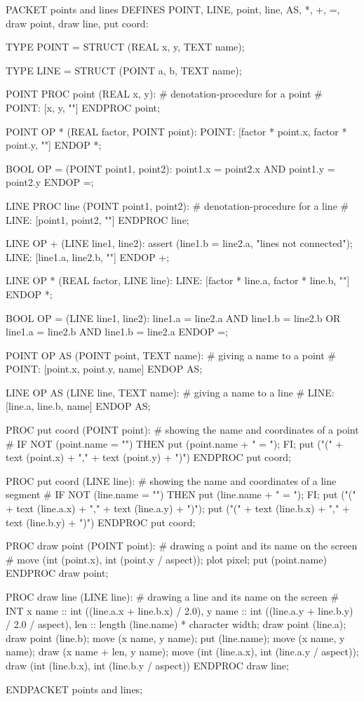 \begin{elan}
PACKET points and lines
DEFINES POINT, LINE,
        point, line, AS, *, +, =,
        draw point, draw line, put coord:

TYPE POINT = STRUCT (REAL x, y, TEXT name);

TYPE LINE = STRUCT (POINT a, b, TEXT name); 

POINT PROC point (REAL x, y):
  \# denotation-procedure for a point \#
  POINT: [x, y, ""]
ENDPROC point;

POINT OP * (REAL factor, POINT point):
  POINT: [factor * point.x, factor * point.y, ""]
ENDOP *;

BOOL OP = (POINT point1, point2):
  point1.x = point2.x AND point1.y = point2.y
ENDOP =;

LINE PROC line (POINT point1, point2):
  \# denotation-procedure for a line \#
  LINE: [point1, point2, ""]
ENDPROC line;

LINE OP + (LINE line1, line2):
  assert (line1.b = line2.a, "lines not connected");
  LINE: [line1.a, line2.b, ""]
ENDOP +;

LINE OP * (REAL factor, LINE line):
  LINE: [factor * line.a, factor * line.b, ""]
ENDOP *;

BOOL OP = (LINE line1, line2):
  line1.a = line2.a AND line1.b = line2.b OR
  line1.a = line2.b AND line1.b = line2.a
ENDOP =;

POINT OP AS (POINT point, TEXT name):
  \# giving a name to a point \#
  POINT: [point.x, point.y, name]
ENDOP AS;

LINE OP AS (LINE line, TEXT name):
  \# giving a name to a line \#
  LINE: [line.a, line.b, name]
ENDOP AS;

PROC put coord (POINT point):
  \# showing the name and coordinates of a point \#
  IF NOT (point.name = "")
  THEN put (point.name + " = ");
  FI;
  put ("(" + text (point.x) + "," + text (point.y) + ")")
ENDPROC put coord;

PROC put coord (LINE line):
  \# showing the name and coordinates of a line segment \#
  IF NOT (line.name = "")
  THEN put (line.name + " = ");
  FI;
  put ("(" + text (line.a.x) + "," + text (line.a.y) + ")");
  put ("(" + text (line.b.x) + "," + text (line.b.y) + ")")
ENDPROC put coord;

PROC draw point (POINT point):
  \# drawing a point and its name on the screen \#
  move (int (point.x), int (point.y / aspect));
  plot pixel;
  put (point.name)
ENDPROC draw point;

PROC draw line (LINE line):
  \# drawing a line and its name on the screen \#
  INT x name :: int ((line.a.x + line.b.x) / 2.0),
      y name :: int ((line.a.y + line.b.y) / 2.0 / aspect),
      len :: length (line.name) * character width;
  draw point (line.a);
  draw point (line.b);
  move (x name, y name);
  put (line.name);
  move (x name, y name);
  draw (x name + len, y name);
  move (int (line.a.x), int (line.a.y / aspect));
  draw (int (line.b.x), int (line.b.y / aspect))
ENDPROC draw line;

ENDPACKET points and lines;
\end{elan}

